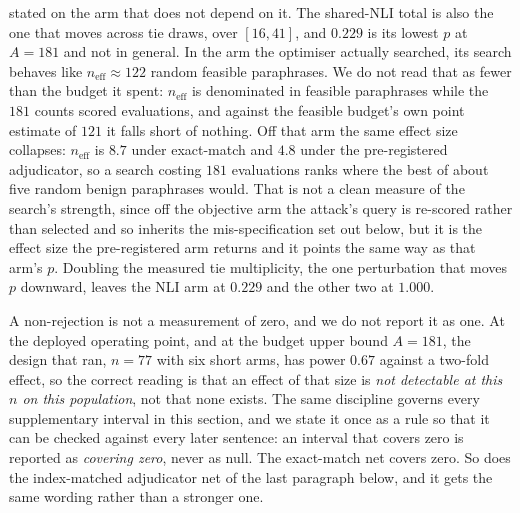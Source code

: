 stated on the arm that does not depend on it. The shared-NLI total is also the one that moves
across tie draws, over $[16,41]$, and $0.229$ is its lowest $p$ at $A{=}181$ and not in
general. In
the arm the optimiser actually searched, its search behaves like
$n_{\mathrm{eff}}{\approx}122$ random feasible paraphrases. We do not read that as fewer than
the budget it spent: $n_{\mathrm{eff}}$ is denominated in feasible paraphrases while the
$181$ counts scored evaluations, and against the feasible budget's own point estimate of
$121$ it falls short of nothing. Off that arm the same effect size collapses:
$n_{\mathrm{eff}}$ is $8.7$ under exact-match and $4.8$ under the pre-registered adjudicator,
so a search costing $181$ evaluations ranks where the best of about five random benign
paraphrases would. That is not a clean measure of the search's strength, since off the
objective arm the attack's query is re-scored rather than selected and so inherits the
mis-specification set out below, but it is the effect size the pre-registered arm returns and
it points the same way as that arm's $p$.
Doubling the measured tie multiplicity, the one perturbation that moves $p$ downward, leaves
the NLI arm at $0.229$ and the other two at $1.000$.

A non-rejection is not a measurement of zero, and we do not report it as one. At the deployed
operating point, and at the budget upper bound $A{=}181$, the design that ran, $n{=}77$ with
six short arms, has power $0.67$ against a two-fold effect, so the
correct reading is that an effect of that size is \emph{not detectable at this $n$ on this
population}, not that none exists. The same discipline governs every supplementary interval in
this section, and we state it once as a rule so that it can be checked against every later
sentence: an interval that covers zero is reported as \emph{covering zero}, never as null. The
exact-match net covers zero. So does the index-matched adjudicator net of the last paragraph
below, and it gets the same wording rather than a stronger one.

